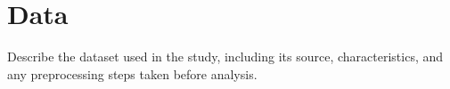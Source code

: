 \section{Data}\label{sec:data}

Describe the dataset used in the study, including its source, characteristics, and any preprocessing steps taken before analysis.